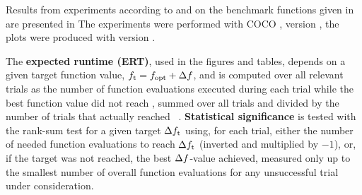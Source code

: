 \documentclass[sigconf]{acmart}
\begin{document}
Results from experiments according to \cite{hansen2016exp} and \cite{hansen2022anytime} on the
benchmark functions given in \cite{varelas2020benchmarking} are
presented in
The experiments were performed with COCO \cite{hansen2020cocoplat}, version
\change{\version}, the plots were produced with version \change{\version}.

The \textbf{expected runtime (ERT)}, used in the figures and tables,
depends on a given target function value, $f_\mathrm{t}=f_\mathrm{opt}+\Delta f$, and is
computed over all relevant trials as the number of function
evaluations executed during each trial while the best function value
did not reach \ftarget, summed over all trials and divided by the
number of trials that actually reached \ftarget\
\cite{hansen2012exp,price1997dev}. 
\textbf{Statistical significance} is tested with the rank-sum test for a given
target $\Delta f_\mathrm{t}$ using, for each trial,
either the number of needed function evaluations to reach
$\Delta f_\mathrm{t}$ (inverted and multiplied by $-1$), or, if the target
was not reached, the best $\Delta f$-value achieved, measured only up to
the smallest number of overall function evaluations for any
unsuccessful trial under consideration.
\end{document}
